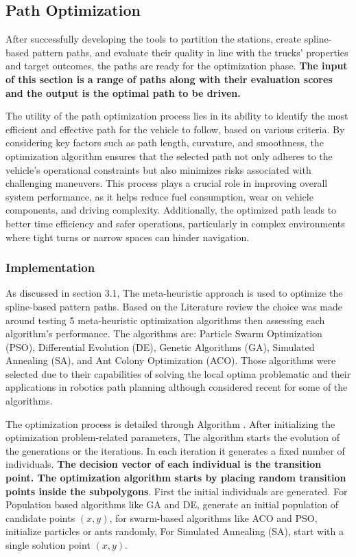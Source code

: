 \newpage
\subsection{Path Optimization}
After successfully developing the tools to partition the stations, create spline-based pattern paths, and evaluate their quality 
in line with the trucks' properties and target outcomes, the paths are ready for the optimization phase.
\textbf{The input of this section is a range of paths along with their evaluation scores and the output is the optimal 
path to be driven.}

The utility of the path optimization process lies in its ability to identify the most efficient and effective path for the 
vehicle to follow, based on various criteria. By considering key factors such as path length, curvature, and smoothness, 
the optimization algorithm ensures that the selected path not only adheres to the vehicle's operational constraints but 
also minimizes risks associated with challenging maneuvers. This process plays a crucial role in improving overall system 
performance, as it helps reduce fuel consumption, wear on vehicle components, and driving complexity. Additionally, 
the optimized path leads to better time efficiency and safer operations, particularly in complex environments where 
tight turns or narrow spaces can hinder navigation.

\subsubsection{Implementation}
As discussed in section 3.1, The meta-heuristic approach is used to optimize the spline-based pattern paths. 
Based on the Literature review the choice was made around testing 5 meta-heuristic optimization algorithms then 
assessing each algorithm's performance. The algorithms are: Particle Swarm Optimization (PSO), Differential Evolution (DE),
Genetic Algorithms (GA), Simulated Annealing (SA), and Ant Colony Optimization (ACO). Those algorithms were selected due 
to their capabilities of solving the local optima problematic and their applications in robotics path planning although 
considered recent for some of the algorithms. 

The optimization process is detailed through Algorithm . After initializing the optimization problem-related
parameters, The algorithm starts the evolution of the generations or the iterations. In each iteration it generates a fixed 
number of individuals. \textbf{The decision vector of each individual is the transition point. The optimization algorithm
starts by placing random transition points inside the subpolygons}. First the initial individuals are generated. 
For Population based algorithms like GA and DE, generate an initial population of candidate points $(x, y)$, for swarm-based algorithms
like ACO and PSO, 
initialize particles or ants randomly, For Simulated Annealing (SA), start with a single solution point $(x, y)$.\\


